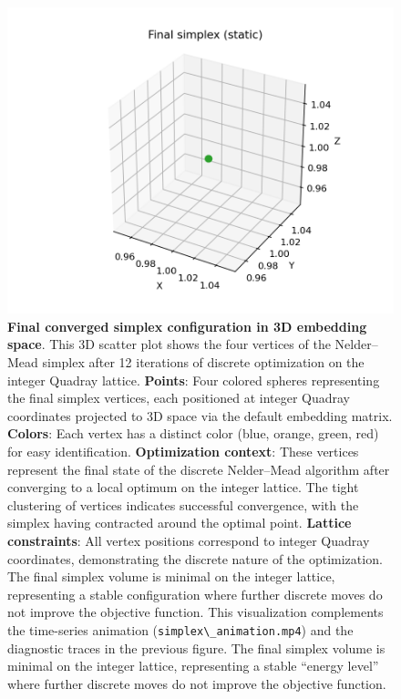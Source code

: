 \documentclass[
  10pt,
]{article}
\newcommand{\passthrough}[1]{#1}
\begin{document}
\begin{figure}
\centering
\includegraphics{../output/figures/simplex_final.png}
\caption{\textbf{Final converged simplex configuration in 3D embedding
space}. This 3D scatter plot shows the four vertices of the Nelder--Mead
simplex after 12 iterations of discrete optimization on the integer
Quadray lattice. \textbf{Points}: Four colored spheres representing the
final simplex vertices, each positioned at integer Quadray coordinates
projected to 3D space via the default embedding matrix. \textbf{Colors}:
Each vertex has a distinct color (blue, orange, green, red) for easy
identification. \textbf{Optimization context}: These vertices represent
the final state of the discrete Nelder--Mead algorithm after converging
to a local optimum on the integer lattice. The tight clustering of
vertices indicates successful convergence, with the simplex having
contracted around the optimal point. \textbf{Lattice constraints}: All
vertex positions correspond to integer Quadray coordinates,
demonstrating the discrete nature of the optimization. The final simplex
volume is minimal on the integer lattice, representing a stable
configuration where further discrete moves do not improve the objective
function. This visualization complements the time-series animation
(\passthrough{\lstinline!simplex\_animation.mp4!}) and the diagnostic
traces in the previous figure. The final simplex volume is minimal on
the integer lattice, representing a stable ``energy level'' where
further discrete moves do not improve the objective function.}
\end{figure}
\end{document}
